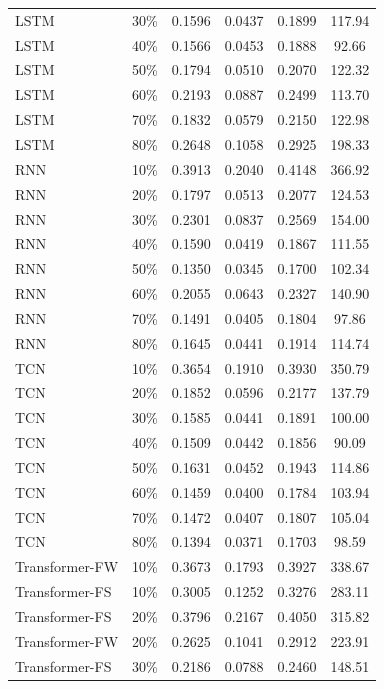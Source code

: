\begin{longtable}{l c c c c c}
        LSTM & 30\% & 0.1596 & 0.0437 & 0.1899 & 117.94 \\
        LSTM & 40\% & 0.1566 & 0.0453 & 0.1888 & 92.66 \\
        LSTM & 50\% & 0.1794 & 0.0510 & 0.2070 & 122.32 \\
        LSTM & 60\% & 0.2193 & 0.0887 & 0.2499 & 113.70 \\
        LSTM & 70\% & 0.1832 & 0.0579 & 0.2150 & 122.98 \\
        LSTM & 80\% & 0.2648 & 0.1058 & 0.2925 & 198.33 \\
        RNN & 10\% & 0.3913 & 0.2040 & 0.4148 & 366.92 \\
        RNN & 20\% & 0.1797 & 0.0513 & 0.2077 & 124.53 \\
        RNN & 30\% & 0.2301 & 0.0837 & 0.2569 & 154.00 \\
        RNN & 40\% & 0.1590 & 0.0419 & 0.1867 & 111.55 \\
        RNN & 50\% & 0.1350 & 0.0345 & 0.1700 & 102.34 \\
        RNN & 60\% & 0.2055 & 0.0643 & 0.2327 & 140.90 \\
        RNN & 70\% & 0.1491 & 0.0405 & 0.1804 & 97.86 \\
        RNN & 80\% & 0.1645 & 0.0441 & 0.1914 & 114.74 \\
        TCN & 10\% & 0.3654 & 0.1910 & 0.3930 & 350.79 \\
        TCN & 20\% & 0.1852 & 0.0596 & 0.2177 & 137.79 \\
        TCN & 30\% & 0.1585 & 0.0441 & 0.1891 & 100.00 \\
        TCN & 40\% & 0.1509 & 0.0442 & 0.1856 & 90.09 \\
        TCN & 50\% & 0.1631 & 0.0452 & 0.1943 & 114.86 \\
        TCN & 60\% & 0.1459 & 0.0400 & 0.1784 & 103.94 \\
        TCN & 70\% & 0.1472 & 0.0407 & 0.1807 & 105.04 \\
        TCN & 80\% & 0.1394 & 0.0371 & 0.1703 & 98.59 \\
        Transformer-FW & 10\% & 0.3673 & 0.1793 & 0.3927 & 338.67 \\
        Transformer-FS & 10\% & 0.3005 & 0.1252 & 0.3276 & 283.11 \\
        Transformer-FS & 20\% & 0.3796 & 0.2167 & 0.4050 & 315.82 \\
        Transformer-FW & 20\% & 0.2625 & 0.1041 & 0.2912 & 223.91 \\
        Transformer-FS & 30\% & 0.2186 & 0.0788 & 0.2460 & 148.51 \\

\end{longtable}
